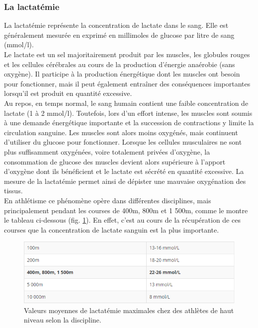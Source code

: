         
        \subsubsection{La lactatémie}\label{lactatemie}
        
        La lactatémie représente la concentration de lactate dans le sang. Elle est généralement mesurée en exprimé en millimoles de glucose par litre de sang (mmol/l). \\

        Le lactate est un sel majoritairement produit par les muscles, les globules rouges et les cellules cérébrales au cours de la production d'énergie anaérobie (sans oxygène). Il participe à la production énergétique dont les muscles ont besoin pour fonctionner, mais il peut également entraîner des conséquences importantes lorsqu'il est produit en quantité excessive.\\

        Au repos, en temps normal, le sang humain contient une faible concentration de lactate (1 à 2 mmol/l). Toutefois, lors d'un effort intense, les muscles sont soumis à une demande énergétique importante et la succession de contractions y limite la circulation sanguine. Les muscles sont alors moins oxygénés, mais continuent d'utiliser du glucose pour fonctionner.
        Lorsque les cellules musculaires ne sont plus suffisamment oxygénées, voire totalement privées d'oxygène, la consommation de glucose des muscles devient alors supérieure à l'apport d'oxygène dont ils bénéficient et le lactate est sécrété en quantité excessive.
        La mesure de la lactatémie permet ainsi de dépister une mauvaise oxygénation des tissus.\\
      
        En athlétisme ce phénomène opère dans différentes disciplines, mais principalement pendant les courses de 400m, 800m et 1 500m, comme le montre le tableau ci-dessous (fig. \ref{fig:lactatemie}). En effet, c'est au cours de la récupération de ces courses que la concentration de lactate sanguin est la plus importante.
        
         \begin{figure}[H]
            \centering
            \includegraphics[scale=0.71]{images/lactatemie}
            \caption{\label{fig:lactatemie}Valeurs moyennes de lactatémie maximales chez des athlètes de haut niveau selon la discipline.}
        \end{figure}
        
